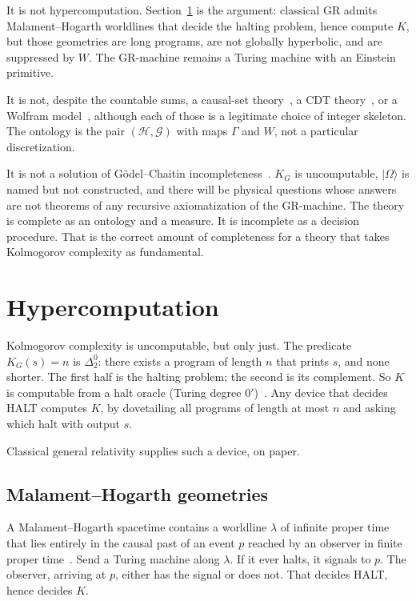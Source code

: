 \documentclass[11pt,a4paper]{article}
\theoremstyle{plain}
\theoremstyle{definition}
\theoremstyle{remark}
\newcommand{\Hil}{\mathcal{H}}
\newcommand{\Geo}{\mathcal{G}}
\newcommand{\KG}{K_{G}}
\newcommand{\ket}[1]{\lvert#1\rangle}
\begin{document}
It is not hypercomputation.
Section~\ref{sec:hyper} is the argument: classical GR admits Malament--Hogarth worldlines that decide the halting problem, hence compute $K$, but those geometries are long programs, are not globally hyperbolic, and are suppressed by $W$.
The GR-machine remains a Turing machine with an Einstein primitive.

It is not, despite the countable sums, a causal-set theory~\cite{bombelli1987}, a CDT theory~\cite{ambjorn2005}, or a Wolfram model~\cite{wolfram2020}, although each of those is a legitimate choice of integer skeleton.
The ontology is the pair $(\Hil,\Geo)$ with maps $\Gamma$ and $W$, not a particular discretization.

It is not a solution of Gödel--Chaitin incompleteness~\cite{chaitin1974,faizal2025}.
$\KG$ is uncomputable, $\ket{\Omega}$ is named but not constructed, and there will be physical questions whose answers are not theorems of any recursive axiomatization of the GR-machine.
The theory is complete as an ontology and a measure.
It is incomplete as a decision procedure.
That is the correct amount of completeness for a theory that takes Kolmogorov complexity as fundamental.

\section{Hypercomputation}
\label{sec:hyper}

Kolmogorov complexity is uncomputable, but only just.
The predicate $\KG(s)=n$ is $\Delta^{0}_{2}$: there exists a program of length $n$ that prints $s$, and none shorter.
The first half is the halting problem; the second is its complement.
So $K$ is computable from a halt oracle (Turing degree $0'$)~\cite{li2008}.
Any device that decides HALT computes $K$, by dovetailing all programs of length at most $n$ and asking which halt with output $s$.

Classical general relativity supplies such a device, on paper.

\subsection{Malament--Hogarth geometries}

A Malament--Hogarth spacetime contains a worldline $\lambda$ of infinite proper time that lies entirely in the causal past of an event $p$ reached by an observer in finite proper time~\cite{earman1993,hogarth2004}.
Send a Turing machine along $\lambda$.
If it ever halts, it signals to $p$.
The observer, arriving at $p$, either has the signal or does not.
That decides HALT, hence decides $K$.
\end{document}
